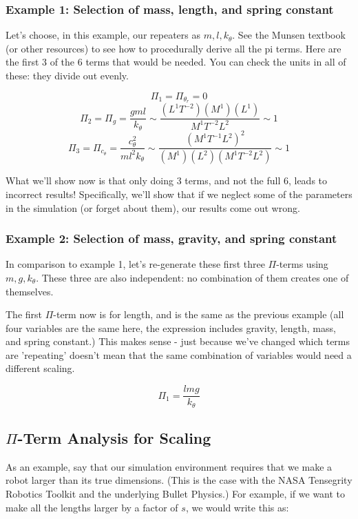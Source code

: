 \documentclass[12pt,letterpaper]{article}
\begin{document}
\subsubsection{Example 1: Selection of mass, length, and spring constant}

Let's choose, in this example, our repeaters as $m, l, k_{\theta}$. See the Munsen textbook (or other resources) to see how to procedurally derive all the pi terms. 
Here are the first 3 of the 6 terms that would be needed.
You can check the units in all of these: they divide out evenly.

\[
\Pi_1 = \Pi_{\theta_r} = 0
\]
\[
\Pi_2 = \Pi_{g} = \frac{gml}{k_{\theta}} \sim \frac{ (L^1 T^{-2}) (M^1) (L^1)}{M^1 T^{-2} L^2} \sim 1
\]
\[
\Pi_3 = \Pi_{c_{\theta}} = \frac{c_{\theta}^2 }{m l^2 k_{\theta}} \sim \frac{ (M^1 T^{-1} L^2)^2 }{ (M^1) (L^2) (M^1 T^{-2} L^2) } \sim 1
\]

What we'll show now is that only doing 3 terms, and not the full 6, leads to incorrect results!
Specifically, we'll show that if we neglect some of the parameters in the simulation (or forget about them), our results come out wrong.

\subsubsection{Example 2: Selection of mass, gravity, and spring constant}

In comparison to example 1, let's re-generate these first three $\Pi$-terms using $m, g, k_\theta$.
These three are also independent: no combination of them creates one of themselves.

The first $\Pi$-term now is for length, and is the same as the previous example (all four variables are the same here, the expression includes gravity, length, mass, and spring constant.)
This makes sense - just because we've changed which terms are 'repeating' doesn't mean that the same combination of variables would need a different scaling.

\[
\Pi_1 = \frac{ l m g}{k_\theta}
\]

\subsection{$\Pi$-Term Analysis for Scaling}

As an example, say that our simulation environment requires that we make a robot larger than its true dimensions.
(This is the case with the NASA Tensegrity Robotics Toolkit and the underlying Bullet Physics.)
For example, if we want to make all the lengths larger by a factor of $s$, we would write this as:
\end{document}
